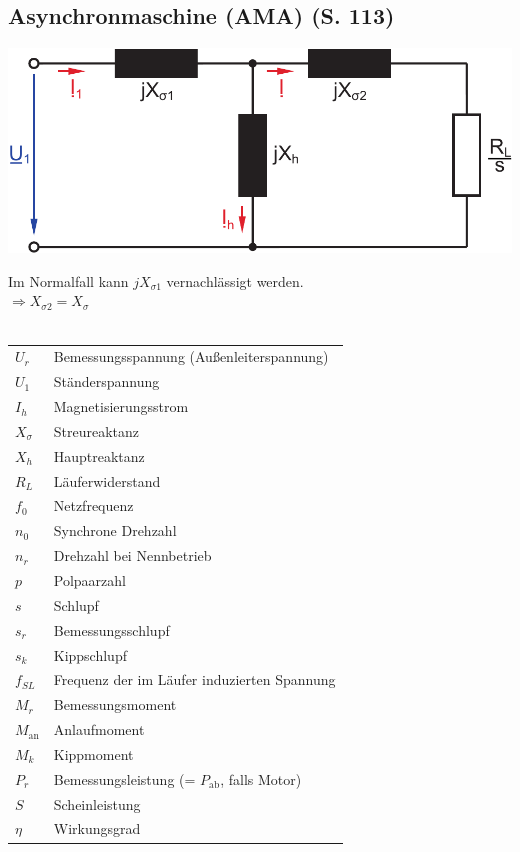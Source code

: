 \documentclass[a4paper,twocolumn,10pt]{article}
\begin{document}
\subsection{Asynchronmaschine (AMA) (S. 113)}
\begin{center}
\includegraphics[width=0.9\columnwidth]{Grafiken/Asynchronmaschine}
\end{center}
Im Normalfall kann $jX_{\sigma1}$ vernachlässigt werden.\\
$\Rightarrow X_{\sigma 2}=X_{\sigma}$\\\\
\begin{tabular}{ll}
$U_r$ & Bemessungsspannung (Außenleiterspannung)\\
$U_1$ & Ständerspannung\\
$I_h$ & Magnetisierungsstrom\\
$X_{\sigma}$ & Streureaktanz\\
$X_h$ & Hauptreaktanz\\
$R_L$ & Läuferwiderstand\\
$f_0$ & Netzfrequenz\\
$n_0$ & Synchrone Drehzahl\\
$n_r$ & Drehzahl bei Nennbetrieb\\
$p$ & Polpaarzahl\\
$s$ & Schlupf\\
$s_r$ & Bemessungsschlupf\\
$s_k$ & Kippschlupf\\
$f_{SL}$ & Frequenz der im Läufer induzierten Spannung\\
$M_r$ & Bemessungsmoment\\
$M_{\text{an}}$ & Anlaufmoment\\
$M_k$ & Kippmoment\\
$P_r$ & Bemessungsleistung (= $P_{\text{ab}}$, falls Motor)\\
$S$ & Scheinleistung\\
$\eta$ & Wirkungsgrad
\end{tabular}\\\\\\
\end{document}

